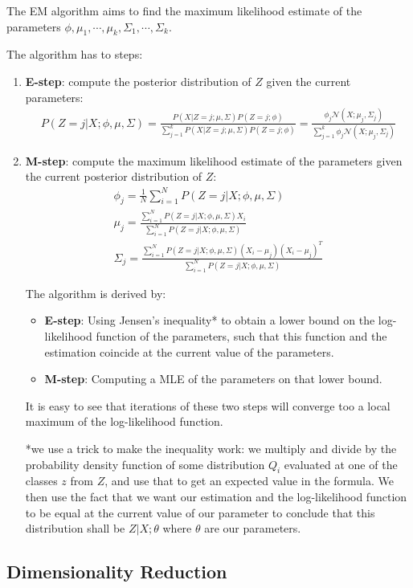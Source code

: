 \documentclass{article}
\begin{document}
The EM algorithm aims to find the maximum likelihood estimate of the parameters $\phi, \mu_1, \cdots, \mu_k, \Sigma_1, \cdots, \Sigma_k$.

The algorithm has to steps:
\begin{enumerate}
\item \textbf{E-step}: compute the posterior distribution of $Z$ given the current parameters:
\begin{gather*}
P(Z = j | X ; \phi, \mu, \Sigma) =
\frac{P(X | Z = j ; \mu, \Sigma) P(Z = j ; \phi)}{\sum_{j=1}^k P(X | Z = j ; \mu, \Sigma) P(Z = j ; \phi)} = 
\frac{\phi_j \mathcal{N}(X ; \mu_j, \Sigma_j)}{\sum_{j=1}^k \phi_j \mathcal{N}(X ; \mu_j, \Sigma_j)}
\end{gather*}
\item \textbf{M-step}: compute the maximum likelihood estimate of the parameters given the current posterior distribution of $Z$:
\begin{gather*}
\phi_j = \frac{1}{N} \sum_{i=1}^N P(Z = j | X ; \phi, \mu, \Sigma) \\
\mu_j = \frac{\sum_{i=1}^N P(Z = j | X ; \phi, \mu, \Sigma) X_i}{\sum_{i=1}^N P(Z = j | X ; \phi, \mu, \Sigma)} \\
\Sigma_j = \frac{\sum_{i=1}^N P(Z = j | X ; \phi, \mu, \Sigma) (X_i - \mu_j)(X_i - \mu_j)^T}{\sum_{i=1}^N P(Z = j | X ; \phi, \mu, \Sigma)}
\end{gather*}

The algorithm is derived by:
\begin{itemize}
\item \textbf{E-step}: Using Jensen's inequality* to obtain a lower bound on the log-likelihood function of the parameters, such that this function and the estimation coincide at the current value of the parameters.
\item \textbf{M-step}: Computing a MLE of the parameters on that lower bound.
\end{itemize}

It is easy to see that iterations of these two steps will converge too a local maximum of the log-likelihood function.

*we use a trick to make the inequality work: we multiply and divide by the probability density function of some distribution $Q_i$ evaluated at one of the classes $z$ from $Z$, and use that to get an expected value in the formula.
We then use the fact that we want our estimation and the log-likelihood function to be equal at the current value of our parameter to conclude that this distribution shall be $Z | X ; \theta$ where $\theta$ are our parameters.

\end{enumerate}

\subsection{Dimensionality Reduction}
\end{document}
